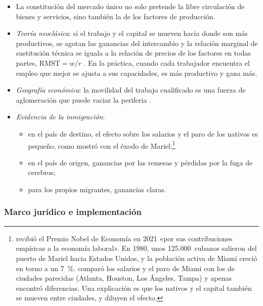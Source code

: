 \documentclass[11pt]{article}
\begin{document}
\begin{itemize}
\item La constitución del mercado único no solo pretende la libre circulación de bienes y servicios, sino también la de los factores de producción.
\item \emph{Teoría neoclásica}: si el trabajo y el capital se mueven hacia donde son más productivos, se agotan las ganancias del intercambio y la relación marginal de sustitución técnica se iguala a la relación de precios de los factores en todas partes, $\mathrm{RMST}=w/r$ . En la práctica, cuando cada trabajador encuentra el empleo que mejor se ajusta a sus capacidades, es más productivo y gana más.
\item \emph{Geografía económica}: la movilidad del trabajo cualificado es una fuerza de aglomeración que puede vaciar la periferia .
\item \emph{Evidencia de la inmigración}:
  \begin{itemize}
  \item en el país de destino, el efecto sobre los salarios y el paro de los nativos es pequeño, como mostró \textcite{Card1990Impact} con el éxodo de Mariel;\footnote{ recibió el Premio Nobel de Economía en 2021 «por sus contribuciones empíricas a la economía laboral»\nocite{Nobel2021CardAngristImbens}. En 1980, unos 125.000~cubanos salieron del puerto de Mariel hacia Estados Unidos, y la población activa de Miami creció en torno a un 7~\%.  comparó los salarios y el paro de Miami con los de ciudades parecidas (Atlanta, Houston, Los Ángeles, Tampa) y apenas encontró diferencias. Una explicación es que los nativos y el capital también se mueven entre ciudades, y diluyen el efecto.}
  \item en el país de origen, ganancias por las remesas y pérdidas por la fuga de cerebros;
  \item para los propios migrantes, ganancias claras.
  \end{itemize}
\end{itemize}

\subsubsection{Marco jurídico e implementación}\label{sec:personas-marco}
\end{document}
